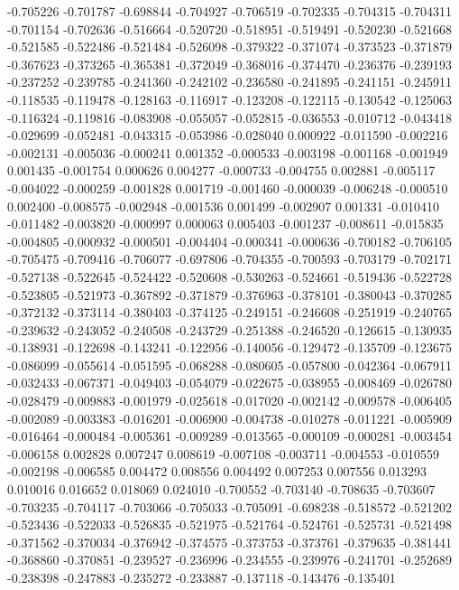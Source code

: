 -0.705226
-0.701787
-0.698844
-0.704927
-0.706519
-0.702335
-0.704315
-0.704311
-0.701154
-0.702636
-0.516664
-0.520720
-0.518951
-0.519491
-0.520230
-0.521668
-0.521585
-0.522486
-0.521484
-0.526098
-0.379322
-0.371074
-0.373523
-0.371879
-0.367623
-0.373265
-0.365381
-0.372049
-0.368016
-0.374470
-0.236376
-0.239193
-0.237252
-0.239785
-0.241360
-0.242102
-0.236580
-0.241895
-0.241151
-0.245911
-0.118535
-0.119478
-0.128163
-0.116917
-0.123208
-0.122115
-0.130542
-0.125063
-0.116324
-0.119816
-0.083908
-0.055057
-0.052815
-0.036553
-0.010712
-0.043418
-0.029699
-0.052481
-0.043315
-0.053986
-0.028040
0.000922
-0.011590
-0.002216
-0.002131
-0.005036
-0.000241
0.001352
-0.000533
-0.003198
-0.001168
-0.001949
0.001435
-0.001754
0.000626
0.004277
-0.000733
-0.004755
0.002881
-0.005117
-0.004022
-0.000259
-0.001828
0.001719
-0.001460
-0.000039
-0.006248
-0.000510
0.002400
-0.008575
-0.002948
-0.001536
0.001499
-0.002907
0.001331
-0.010410
-0.011482
-0.003820
-0.000997
0.000063
0.005403
-0.001237
-0.008611
-0.015835
-0.004805
-0.000932
-0.000501
-0.004404
-0.000341
-0.000636
-0.700182
-0.706105
-0.705475
-0.709416
-0.706077
-0.697806
-0.704355
-0.700593
-0.703179
-0.702171
-0.527138
-0.522645
-0.524422
-0.520608
-0.530263
-0.524661
-0.519436
-0.522728
-0.523805
-0.521973
-0.367892
-0.371879
-0.376963
-0.378101
-0.380043
-0.370285
-0.372132
-0.373114
-0.380403
-0.374125
-0.249151
-0.246608
-0.251919
-0.240765
-0.239632
-0.243052
-0.240508
-0.243729
-0.251388
-0.246520
-0.126615
-0.130935
-0.138931
-0.122698
-0.143241
-0.122956
-0.140056
-0.129472
-0.135709
-0.123675
-0.086099
-0.055614
-0.051595
-0.068288
-0.080605
-0.057800
-0.042364
-0.067911
-0.032433
-0.067371
-0.049403
-0.054079
-0.022675
-0.038955
-0.008469
-0.026780
-0.028479
-0.009883
-0.001979
-0.025618
-0.017020
-0.002142
-0.009578
-0.006405
-0.002089
-0.003383
-0.016201
-0.006900
-0.004738
-0.010278
-0.011221
-0.005909
-0.016464
-0.000484
-0.005361
-0.009289
-0.013565
-0.000109
-0.000281
-0.003454
-0.006158
0.002828
0.007247
0.008619
-0.007108
-0.003711
-0.004553
-0.010559
-0.002198
-0.006585
0.004472
0.008556
0.004492
0.007253
0.007556
0.013293
0.010016
0.016652
0.018069
0.024010
-0.700552
-0.703140
-0.708635
-0.703607
-0.703235
-0.704117
-0.703066
-0.705033
-0.705091
-0.698238
-0.518572
-0.521202
-0.523436
-0.522033
-0.526835
-0.521975
-0.521764
-0.524761
-0.525731
-0.521498
-0.371562
-0.370034
-0.376942
-0.374575
-0.373753
-0.373761
-0.379635
-0.381441
-0.368860
-0.370851
-0.239527
-0.236996
-0.234555
-0.239976
-0.241701
-0.252689
-0.238398
-0.247883
-0.235272
-0.233887
-0.137118
-0.143476
-0.135401
